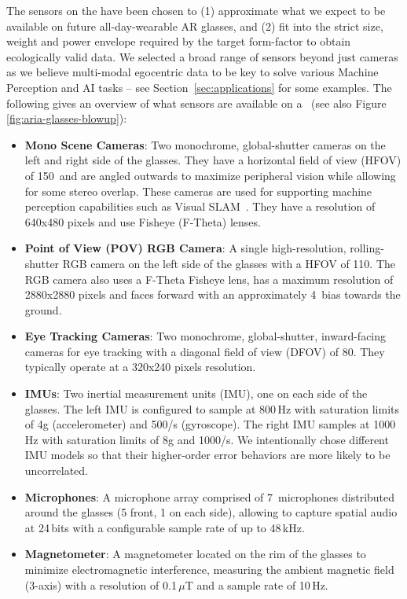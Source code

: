 The sensors on the \AriaDevice{} have been chosen to (1) approximate what we expect to be available on future all-day-wearable AR glasses, and (2) fit into the strict size, weight and power envelope required by the target form-factor to obtain ecologically valid data. We selected a broad range of sensors beyond just cameras as we believe multi-modal egocentric data to be key to solve various Machine Perception and AI tasks -- see Section~\ref{sec:applications} for some examples. The following gives an overview of what sensors are available on a \AriaDevice\ (see also Figure \ref{fig:aria-glasses-blowup}):
\begin{itemize}
  \setlength\itemsep{0em}
\item \textbf{Mono Scene Cameras}: Two monochrome, global-shutter cameras on the left and right side of the glasses. They have a horizontal field of view (HFOV) of 150\textdegree\ and are angled outwards to maximize peripheral vision while allowing for some stereo overlap. These cameras are used for supporting machine perception capabilities such as Visual SLAM~\cite{engel2014lsd, mur2017orb, mourikis2007multi}.
They have a resolution of 640x480 pixels and use Fisheye (F-Theta) lenses.
\item \textbf{Point of View (POV) RGB Camera}: A single high-resolution, rolling-shutter RGB camera on the left side of the glasses with a HFOV of 110\textdegree. The RGB camera also uses a F-Theta Fisheye lens, has a maximum resolution of 2880x2880 pixels and faces forward with an approximately 4\textdegree\ bias towards the ground. 
\item \textbf{Eye Tracking Cameras}: Two monochrome, global-shutter, inward-facing cameras for eye tracking with a diagonal field of view (DFOV) of 80\textdegree. They typically operate at a 320x240 pixels resolution.
\item \textbf{IMUs}: Two inertial measurement units (IMU), one on each side of the glasses. The left IMU is configured to sample at 800\,Hz with saturation limits of 4g (accelerometer) and  500\textdegree/s (gyroscope). The right IMU samples at 1000\,Hz with saturation limits of 8g and 1000\textdegree/s. We intentionally chose different IMU models so that their higher-order error behaviors are more likely to be uncorrelated.
\item \textbf{Microphones}: A microphone array comprised of 7~microphones distributed around the glasses (5 front, 1 on each side), allowing to capture spatial audio at 24\,bits with a configurable sample rate of up to 48\,kHz.
\item \textbf{Magnetometer}: A magnetometer located on the rim of the glasses to minimize electromagnetic interference, measuring the ambient magnetic field (3-axis) with a resolution of 0.1\,$\mu$T and a sample rate of 10\,Hz.

\end{itemize}

